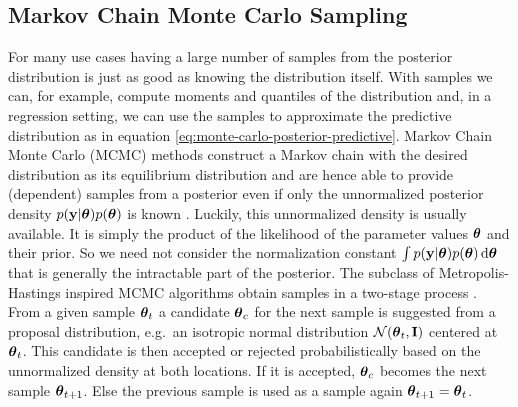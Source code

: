 \documentclass[../thesis.tex]{subfiles}
\begin{document}
\subsection{Markov Chain Monte Carlo Sampling}
For many use cases having a large number of samples from the posterior distribution is just as good as knowing the distribution itself. With samples we can, for example, compute moments and quantiles of the distribution and, in a regression setting, we can use the samples to approximate the predictive distribution as in equation \ref{eq:monte-carlo-posterior-predictive}. Markov Chain Monte Carlo (MCMC) methods construct a Markov chain with the desired distribution as its equilibrium distribution and are hence able to provide (dependent) samples from a posterior even if only the unnormalized posterior density $p(\boldsymbol{\mathbf{y}}|\boldsymbol{\mathbf{\theta}})p(\boldsymbol{\mathbf{\theta}})$ is known \parencite{andrieu2003introduction}. Luckily, this unnormalized density is usually available. It is simply the product of the likelihood of the parameter values $\boldsymbol{\mathbf{\theta}}$ and their prior. So we need not consider the normalization constant $\int p(\boldsymbol{\mathbf{y}}|\boldsymbol{\mathbf{\theta}})p(\boldsymbol{\mathbf{\theta}}) \mathop{}\!\mathrm{d} \boldsymbol{\mathbf{\theta}}$ that is generally the intractable part of the posterior. The subclass of Metropolis-Hastings inspired MCMC algorithms obtain samples in a two-stage process \parencite{metropolis1953equation, hastings1970monte}. From a given sample $\boldsymbol{\mathbf{\theta}}_t$ a candidate $\boldsymbol{\mathbf{\theta}}_{c}$ for the next sample is suggested from a proposal distribution, e.g.\ an isotropic normal distribution $\mathcal{N}(\boldsymbol{\mathbf{\theta}}_t, \boldsymbol{\mathbf{I}})$ centered at $\boldsymbol{\mathbf{\theta}}_t$. This candidate is then accepted or rejected probabilistically based on the unnormalized density at both locations. If it is accepted, $\boldsymbol{\mathbf{\theta}}_c$ becomes the next sample $\boldsymbol{\mathbf{\theta}}_{t+1}$. Else the previous sample is used as a sample again $\boldsymbol{\mathbf{\theta}}_{t+1} = \boldsymbol{\mathbf{\theta}}_t$.
\end{document}
